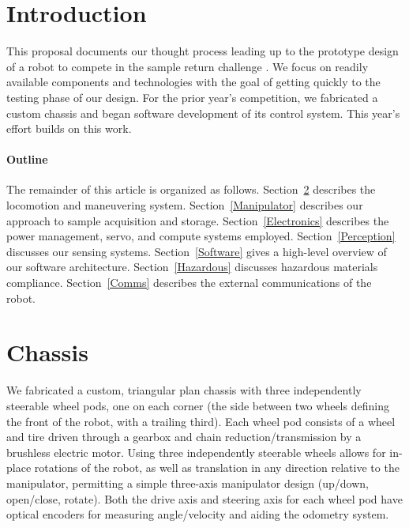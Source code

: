 \documentclass[12pt]{article}
\begin{document}
\section{Introduction}
This proposal documents our thought process leading up to the prototype design of a robot to compete in the sample return challenge \cite{rules}. We focus on readily available components and technologies with the goal of getting quickly to the testing phase of our design. For the prior year's competition, we fabricated a custom chassis and began software development of its control system. This year's effort builds on this work.

\paragraph{Outline}
The remainder of this article is organized as follows.
Section~\ref{Chassis} describes the locomotion and maneuvering system. Section~\ref{Manipulator} describes our approach to sample acquisition and storage. Section~\ref{Electronics} describes the power management, servo, and compute systems employed. Section~\ref{Perception} discusses our sensing systems. Section~\ref{Software} gives a high-level overview of our software architecture. Section~\ref{Hazardous} discusses hazardous materials compliance. Section~\ref{Comms} describes the external communications of the robot.


%
%

\section{Chassis}\label{Chassis}

We fabricated a custom, triangular plan chassis with three independently steerable wheel pods, one on each corner (the side between two wheels defining the front of the robot, with a trailing third). Each wheel pod consists of a wheel and tire driven through a gearbox and chain reduction/transmission by a brushless electric motor. Using three independently steerable wheels allows for in-place rotations of the robot, as well as translation in any direction relative to the manipulator, permitting a simple three-axis manipulator design (up/down, open/close, rotate). Both the drive axis and steering axis for each wheel pod have optical encoders for measuring angle/velocity and aiding the odometry system.
\end{document}
